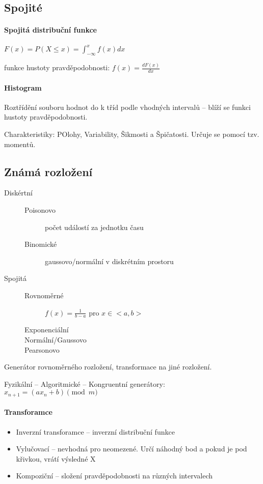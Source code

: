 \documentclass[a4paper, 11pt]{report}
\begin{document}
\subsection{Spojité}

\paragraph{Spojitá distribuční funkce}
$F(x) = P(X \leq x) = \int^x_{-\infty} f(x) dx$

funkce hustoty pravděpodobnosti: $f(x) = \frac{dF(x)}{dx}$

\paragraph{Histogram}
Roztřídění souboru hodnot do k tříd podle vhodných intervalů -- blíží se funkci hustoty pravděpodobnosti.

Charakteristiky: POlohy, Variability, Šikmosti a Špičatosti. Určuje se pomocí tzv. momentů.

\subsection{Známá rozložení}
\begin{description}
	\item[Diskértní] \hfill
	\begin{description}
		\item[Poisonovo] počet událostí za jednotku času
		\item[Binomické] gaussovo/normální v diskrétním prostoru
	\end{description}
	\item[Spojitá] \hfill
	\begin{description}
		\item[Rovnoměrné] $f(x) = \frac{1}{b-a}$ pro $x \in <a,b>$
		\item[Exponenciální]
		\item[Normální/Gaussovo]
		\item[Pearsonovo]
	\end{description}
\end{description}

Generátor rovnoměrného rozložení, transformace na jiné rozložení.

Fyzikální -- Algoritmické -- Kongruentní generátory: $x_{n+1} = (ax_n+b)\pmod m$

\paragraph{Transforamce}
\begin{itemize}
	\item Inverzní transforamce -- inverzní distribuční funkce
	\item Vylučovací -- nevhodná pro neomezené. Určí náhodný bod a pokud je pod křivkou, vrátí výsledné X
	\item Kompoziční -- složení pravděpodobnosti na různých intervalech
\end{itemize}
\end{document}
